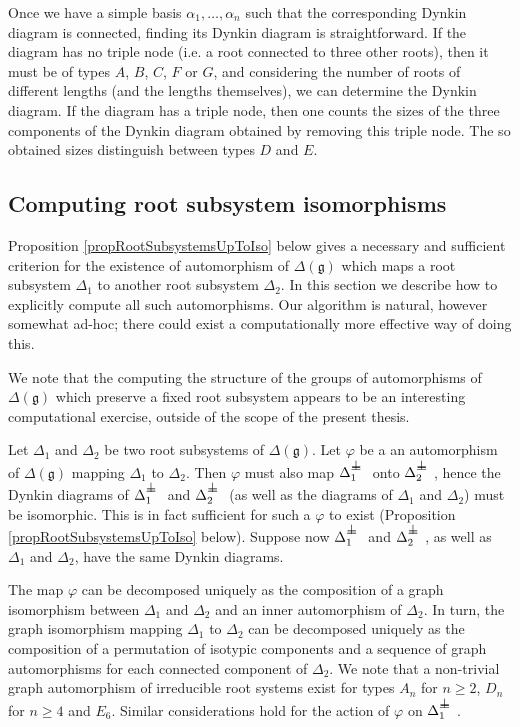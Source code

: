 \documentclass[12pt]{report}
\newcommand{\gG}{\mathfrak{g}}
\renewcommand {\phi} {\varphi}
\def\sperp{{\hbox{$\perp${\hbox{\kern -.77em $-$}\raise-1pt\hbox{\kern -.77em $-$}}\ }}}
\begin{document}
Once we have a simple basis $\alpha_1,\dots,\alpha_n$ such that the corresponding Dynkin diagram is connected, finding its Dynkin diagram is straightforward. If the diagram has no triple node (i.e. a root connected to three other roots), then it must be of types $A$, $B$, $C$, $F$ or $G$, and considering the number of roots of different lengths (and the lengths themselves), we can determine the Dynkin diagram. If the diagram has a triple node, then one counts the sizes of the three components of the Dynkin diagram obtained by removing this triple node. The so obtained sizes distinguish between types $D$ and $E$.

\subsection{Computing root subsystem isomorphisms}\label{secRootSubsystemIsos}
Proposition \ref{propRootSubsystemsUpToIso} below gives a necessary and sufficient criterion for the existence of automorphism of $\Delta(\gG)$ which maps a root subsystem $\Delta_1$ to another root subsystem $\Delta_2$. In this section we describe how to explicitly compute all such automorphisms. Our algorithm is natural, however somewhat ad-hoc; there could exist a computationally more effective way of doing this. 

We note that the computing the structure of the groups of automorphisms of $\Delta(\gG)$ which preserve a fixed root subsystem appears to be an interesting computational exercise, outside of the scope of the present thesis.

Let $\Delta_1$ and $\Delta_2$ be two root subsystems of $\Delta(\gG)$. Let $\phi$ be a an automorphism of $\Delta(\gG)$ mapping $\Delta_1$ to $\Delta_2$. Then $\phi$ must also map $\Delta_1^\sperp$ onto $\Delta_2^\sperp$, hence the Dynkin diagrams of $\Delta_1^\sperp$ and $\Delta_2^\sperp$ (as well as the diagrams of $\Delta_1$ and $\Delta_2$) must be isomorphic. This is in fact sufficient for such a $\phi$ to exist (Proposition \ref{propRootSubsystemsUpToIso} below). Suppose now $\Delta_1^\sperp$ and $\Delta_2^\sperp$, as well as $\Delta_1$ and $\Delta_2$, have the same Dynkin diagrams. 

The map $\phi$ can be decomposed uniquely as the composition of a graph isomorphism between $\Delta_1$ and $\Delta_2$ and an inner automorphism of $\Delta_2$. In turn, the graph isomorphism mapping $\Delta_1$ to $\Delta_2$ can be decomposed uniquely as the composition of a permutation of isotypic components and a sequence of graph automorphisms for each connected component of $\Delta_2$. We note that a non-trivial graph automorphism of irreducible root systems exist for types $A_n$ for $n\geq 2$, $D_n$ for $n\geq 4$ and $E_6$. Similar considerations hold for the action of $\phi$ on $\Delta_1^\sperp$. 
\end{document}
